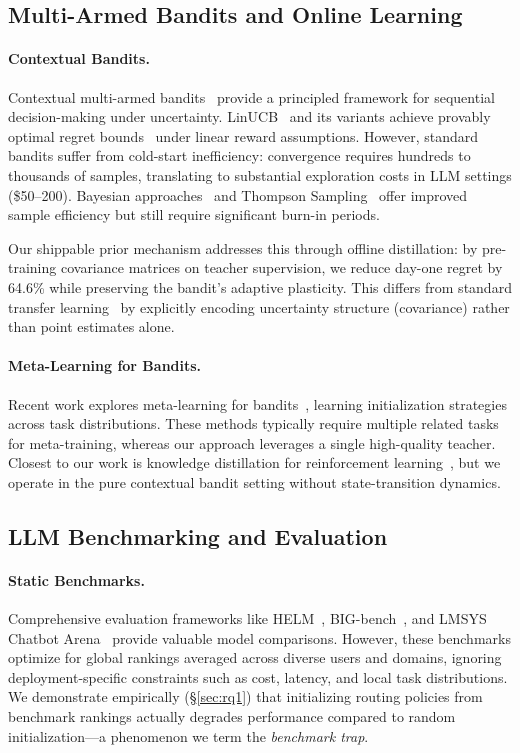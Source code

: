 \subsection{Multi-Armed Bandits and Online Learning}

\paragraph{Contextual Bandits.} Contextual multi-armed bandits~\cite{li2010contextual,chu2011contextual} provide a principled framework for sequential decision-making under uncertainty. LinUCB~\cite{li2010contextual} and its variants achieve provably optimal regret bounds~\cite{abbasi2011improved} under linear reward assumptions. However, standard bandits suffer from cold-start inefficiency: convergence requires hundreds to thousands of samples, translating to substantial exploration costs in LLM settings (\$50--200). Bayesian approaches~\cite{russo2018tutorial} and Thompson Sampling~\cite{agrawal2013thompson} offer improved sample efficiency but still require significant burn-in periods.

Our shippable prior mechanism addresses this through offline distillation: by pre-training covariance matrices on teacher supervision, we reduce day-one regret by 64.6\% while preserving the bandit's adaptive plasticity. This differs from standard transfer learning~\cite{taylor2009transfer} by explicitly encoding uncertainty structure (covariance) rather than point estimates alone.

\paragraph{Meta-Learning for Bandits.} Recent work explores meta-learning for bandits~\cite{kveton2020meta,zhou2020metalearning}, learning initialization strategies across task distributions. These methods typically require multiple related tasks for meta-training, whereas our approach leverages a single high-quality teacher. Closest to our work is knowledge distillation for reinforcement learning~\cite{rusu2015policy}, but we operate in the pure contextual bandit setting without state-transition dynamics.

\subsection{LLM Benchmarking and Evaluation}

\paragraph{Static Benchmarks.} Comprehensive evaluation frameworks like HELM~\cite{liang2022holistic}, BIG-bench~\cite{srivastava2022beyond}, and LMSYS Chatbot Arena~\cite{zheng2023judging} provide valuable model comparisons. However, these benchmarks optimize for global rankings averaged across diverse users and domains, ignoring deployment-specific constraints such as cost, latency, and local task distributions. We demonstrate empirically (\S\ref{sec:rq1}) that initializing routing policies from benchmark rankings actually degrades performance compared to random initialization---a phenomenon we term the \emph{benchmark trap}.

